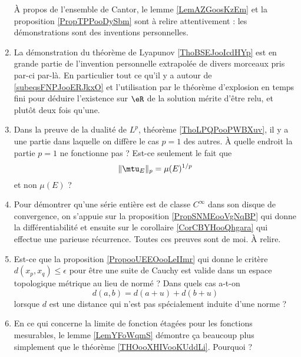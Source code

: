 \begin{enumerate}
        À propos de l'ensemble de Cantor, le lemme \ref{LemAZGoosKzEm} et la proposition \ref{PropTPPooDySbm} sont à relire attentivement : les démonstrations sont des inventions personnelles.

    \item

        La démonstration du théorème de Lyapunov \ref{ThoBSEJooIcdHYp} est en grande partie de l'invention personnelle extrapolée de divers morceaux pris par-ci par-là. En particulier tout ce qu'il y a autour de \eqref{subeqsFNPJooERJkxO} et l'utilisation par le théorème d'explosion en temps fini pour déduire l'existence sur \( \eR\) de la solution mérite d'être relu, et plutôt deux fois qu'une.

    \item

        Dans la preuve de la dualité de \( L^p\), théorème \ref{ThoLPQPooPWBXuv}, il y a une partie dans laquelle on diffère le cas \( p= 1\) des autres. À quelle endroit la partie \( p=1\) ne fonctionne pas ? Est-ce seulement le fait que
        \begin{equation}
            \| \mtu_E \|_p=\mu(E)^{1/p} 
        \end{equation}
        et non \( \mu(E)\) ?

    \item
        Pour démontrer qu'une série entière est de classe \(  C^{\infty}\) dans son disque de convergence, on s'appuie sur la proposition \ref{PropSNMEooVgNqBP} qui donne la différentiabilité et ensuite sur le corollaire \ref{CorCBYHooQhgara} qui effectue une parieuse récurrence. Toutes ces preuves sont de moi. À relire.
    \item
        Est-ce que la proposition \ref{PropooUEEOooLeIImr} qui donne le critère \( d(x_p,x_q)\leq \epsilon\) pour être une suite de Cauchy est valide dans un espace topologique métrique au lieu de normé ?  Dans quels cas a-t-on
        \begin{equation}
            d(a,b)=d(a+u)+d(b+u) 
        \end{equation}
        lorsque \( d\) est une distance qui n'est pas spécialement induite d'une norme ?
    \item
        En ce qui concerne la limite de fonction étagées pour les fonctions mesurables, le lemme \ref{LemYFoWqmS} démontre ça beaucoup plus simplement que le théorème \ref{THOooXHIVooKUddLi}. Pourquoi ?
\end{enumerate}

